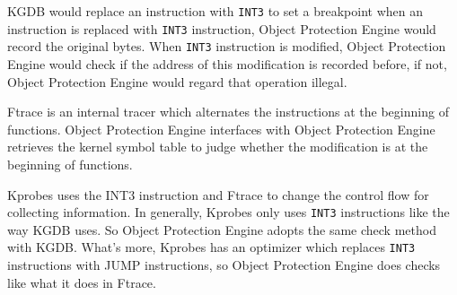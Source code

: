 \documentclass[conference]{IEEEtran}
\begin{document}
KGDB would replace an instruction with \verb|INT3| to set a breakpoint when an instruction is replaced with \verb|INT3| instruction, Object Protection Engine would record the original bytes. When \verb|INT3| instruction is modified, Object Protection Engine would check if the address of this modification is recorded before, if not, Object Protection Engine would regard that operation illegal. 


Ftrace is an internal tracer which alternates the instructions at the beginning of functions. Object Protection Engine interfaces with Object Protection Engine retrieves the kernel symbol table to judge whether the modification is at the beginning of functions. 

Kprobes uses the INT3 instruction and Ftrace to change the control flow for collecting information.
In generally, Kprobes only uses \verb|INT3| instructions like the way KGDB uses. So Object Protection Engine adopts the same check method with KGDB\@. What's more, Kprobes has an optimizer which replaces \verb|INT3| instructions with JUMP instructions, so Object Protection Engine does checks like what it does in Ftrace. 
\end{document}
